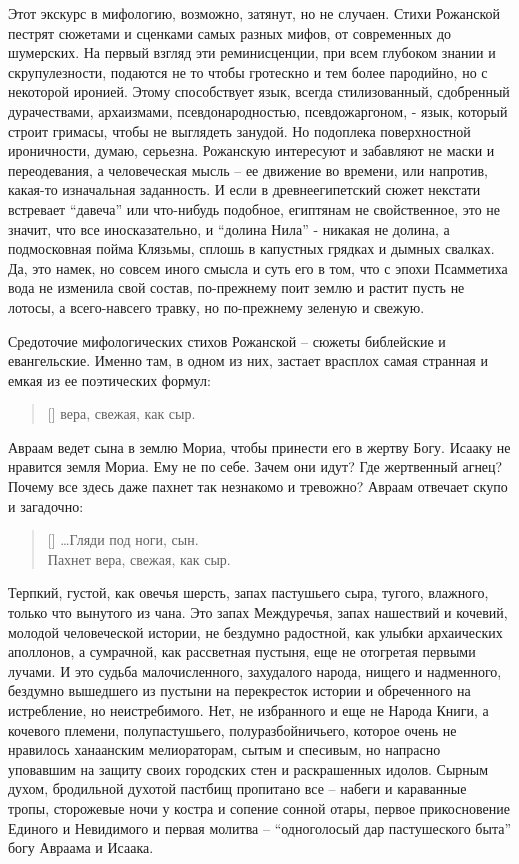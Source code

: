 \documentclass[12pt,a5paper,twoside]{article}
\begin{document}
Этот экскурс в мифологию, возможно, затянут, но не случаен. Стихи Рожанской пестрят сюжетами и 
сценками самых разных мифов, от современных до шумерских. На первый взгляд эти реминисценции, 
при всем глубоком знании и скрупулезности, подаются не то чтобы гротескно и тем более пародийно, 
но с некоторой иронией. Этому способствует язык, всегда стилизованный, сдобренный дурачествами, архаизмами, 
псевдонародностью, псевдожаргоном, - язык, который строит гримасы, чтобы не выглядеть занудой. Но 
подоплека поверхностной ироничности, думаю, серьезна. Рожанскую интересуют и забавляют не маски и 
переодевания, а человеческая мысль -- ее движение во времени, или напротив, какая-то изначальная 
заданность. И если в древнеегипетский сюжет некстати встревает ``давеча'' или что-нибудь подобное, 
египтянам не свойственное, это не значит, что все иносказательно, и ``долина Нила'' - никакая не 
долина, а подмосковная пойма Клязьмы, сплошь в капустных грядках и дымных свалках. Да, это 
намек, но совсем иного смысла и суть его в том, что с эпохи Псамметиха вода не изменила свой 
состав, по-прежнему поит землю и растит пусть не лотосы, а всего-навсего травку, но по-прежнему зеленую и свежую.

Средоточие мифологических стихов Рожанской -- сюжеты библейские и евангельские. Именно там, в 
одном из них, застает врасплох самая странная и емкая из ее поэтических формул:

\settowidth{\versewidth}{вера, свежая, как сыр.}
\begin{verse}[\versewidth]
вера, свежая, как сыр.
\end{verse}

Авраам ведет сына в землю Мориа, чтобы принести его в жертву Богу. Исааку 
не нравится земля Мориа. Ему не по себе. Зачем они идут? Где жертвенный 
агнец? Почему все здесь даже пахнет так незнакомо и тревожно? Авраам отвечает скупо и загадочно:

\settowidth{\versewidth}{…Гляди под ноги, сын.}
\begin{verse}[\versewidth]
…Гляди под ноги, сын.\\
Пахнет вера, свежая, как сыр.
\end{verse}

Терпкий, густой, как овечья шерсть, запах пастушьего сыра, тугого, влажного, только 
что вынутого из чана. Это запах Междуречья, запах нашествий и кочевий, молодой человеческой 
истории, не бездумно радостной, как улыбки архаических аполлонов, а сумрачной, как рассветная 
пустыня, еще не отогретая первыми лучами. И это судьба малочисленного, захудалого народа, 
нищего и надменного, бездумно вышедшего из пустыни на перекресток истории и обреченного на 
истребление, но неистребимого. Нет, не избранного и еще не Народа Книги, а кочевого племени, 
полупастушьего, полуразбойничьего, которое очень не нравилось ханаанским мелиораторам, сытым и 
спесивым, но напрасно уповавшим на защиту своих городских стен и раскрашенных идолов. 
Сырным духом, бродильной духотой пастбищ пропитано все -- набеги и караванные тропы, сторожевые 
ночи у костра и сопение сонной отары, первое прикосновение Единого и Невидимого и первая 
молитва -- ``одноголосый дар пастушеского быта'' богу Авраама и Исаака.
\end{document}
